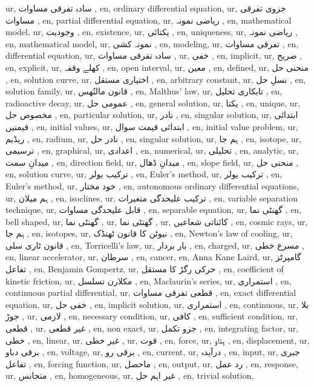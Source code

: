 ur, سادہ تفرقی مساوات ,
en, ordinary differential equation,
ur, جزوی تفرقی مساوات ,
en, partial differential equation,
ur, ریاضی نمونہ ,
en, mathematical model,
ur, وجودیت ,
en, existence,
ur, یکتائی ,
en, uniqueness,
ur, ریاضی نمونہ ,
en, mathematical model,
ur, نمونہ کشی ,
en, modeling,
ur, تفرقی مساوات ,
en, differential equation,
ur, سادہ تفرقی مساوات ,
ur, خفی ,
en, implicit,
ur, صریح ,
en, explicit,
ur, کھلے وقفہ ,
en, open interval,
ur, معین ,
en, defined,
ur, منحنی حل ,
en, solution curve,
ur, اختیاری مستقل ,
en, arbitrary constant,
ur, نسلِ حل ,
en, solution family,
ur, قانون مالتُھس ,
en, Malthus' law,
ur, تابکاری تحلیل ,
en, radioactive decay,
ur, عمومی حل ,
en, general solution,
ur, یکتا ,
en, unique,
ur, مخصوص حل ,
en, particular solution,
ur, نادر ,
en, singular solution,
ur, ابتدائی قیمتیں ,
en, initial values,
ur, ابتدائی قیمت سوال ,
en, initial value problem,
ur, ریڈیم ,
en, radium,
ur, نادر حل ,
en, singular solution,
ur, ہم جا ,
en, isotope,
ur, ترسیمی ,
en, graphical,
ur, اعدادی ,
en, numerical,
ur, تحلیلی ,
en, analytic,
ur, میدانِ سمت ,
en, direction field,
ur, میدانِ ڈھال ,
en, slope field,
ur, منحنی حل ,
en, solution curve,
ur, ترکیب یولر ,
en, Euler's method,
ur, ترکیب یولر ,
en, Euler's method,
ur, خود مختار ,
en, autonomous ordinary differential equations,
ur, ہم میلان ,
en, isoclines,
ur, ترکیب علیحدگی متغیرات ,
en, variable separation technique,
ur, قابل علیحدگی مساوات ,
en, separable equation,
ur, گھنٹی نما ,
en, bell shaped,
ur, گھنٹی نما ,
ur, گھنٹی نما ,
ur, کائناتی شعاعیں ,
en, cosmic rays,
ur, ہم جا ,
en, isotopes,
ur, نیوٹن کا قانون ٹھنڈک ,
en, Newton's law of cooling,
ur, قانون ٹاری سلی ,
en, Torricelli's law,
ur, بار بردار ,
en, charged,
ur, مسرع خطی ,
en, linear accelerator,
ur, سرطان ,
en, cancer,
en, Anna Kane Laird,
ur, گامپرٹز تفاعل ,
en, Benjamin Gompertz,
ur, حرکی رگڑ کا مستقل ,
en, coefficient of kinetic friction,
ur, مکلارن تسلسل ,
en, Maclaurin's series,
ur, استمراری ,
en, continuous partial differential,
ur, قطعی تفرقی مساوات ,
en, exact differential equation,
ur, خفی حل ,
en, implicit solution,
ur, استمراری ,
en, continuous,
ur, بلا جوڑ ,
ur, لازمی ,
en, necessary condition,
ur, کافی ,
en, sufficient condition,
ur, قطعی ,
ur, غیر قطعی ,
en, non exact,
ur, جزو تکمل ,
en, integrating factor,
ur, خطی ,
en, linear,
ur, غیر خطی ,
ur, قوت ,
en, force,
ur, ہٹاو ,
en, displacement,
ur, برقی دباو ,
en, voltage,
ur, برقی رو ,
en, current,
ur, درآیدہ ,
en, input,
ur, جبری تفاعل ,
en, forcing function,
ur, ماحصل ,
en, output,
ur, رد عمل ,
en, response,
ur, متجانس ,
en, homogeneous,
ur, غیر اہم حل ,
en, trivial solution,

